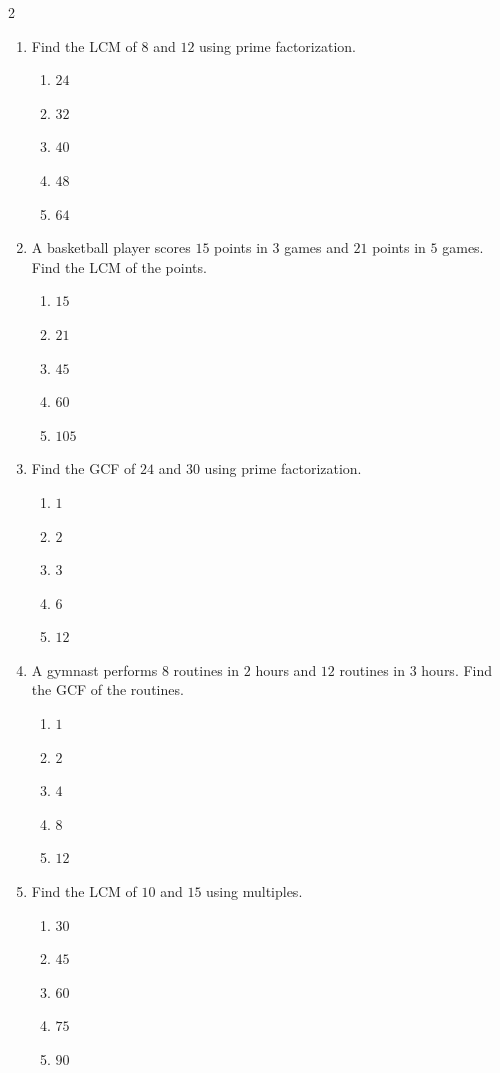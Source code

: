 \documentclass[10pt]{article}
\begin{document}
\begin{multicols}{2}
\begin{enumerate}[label=\textbf{Q\arabic*.}, leftmargin=*, itemsep=6pt, parsep=0pt]
  \item \small Find the LCM of $8$ and $12$ using prime factorization.
  \begin{enumerate}[label=(\Alph*), leftmargin=0.6cm, nosep, itemsep=2pt]
    \item $24$
    \item $32$
    \item $40$
    \item $48$
    \item $64$
  \end{enumerate}

  \item \small A basketball player scores $15$ points in $3$ games and $21$ points in $5$ games. Find the LCM of the points.
  \begin{enumerate}[label=(\Alph*), leftmargin=0.6cm, nosep, itemsep=2pt]
    \item $15$
    \item $21$
    \item $45$
    \item $60$
    \item $105$
  \end{enumerate}

  \item \small Find the GCF of $24$ and $30$ using prime factorization.
  \begin{enumerate}[label=(\Alph*), leftmargin=0.6cm, nosep, itemsep=2pt]
    \item $1$
    \item $2$
    \item $3$
    \item $6$
    \item $12$
  \end{enumerate}

  \item \small A gymnast performs $8$ routines in $2$ hours and $12$ routines in $3$ hours. Find the GCF of the routines.
  \begin{enumerate}[label=(\Alph*), leftmargin=0.6cm, nosep, itemsep=2pt]
    \item $1$
    \item $2$
    \item $4$
    \item $8$
    \item $12$
  \end{enumerate}

  \item \small Find the LCM of $10$ and $15$ using multiples.
  \begin{enumerate}[label=(\Alph*), leftmargin=0.6cm, nosep, itemsep=2pt]
    \item $30$
    \item $45$
    \item $60$
    \item $75$
    \item $90$
  \end{enumerate}

\end{enumerate}
\end{multicols}
\end{document}
